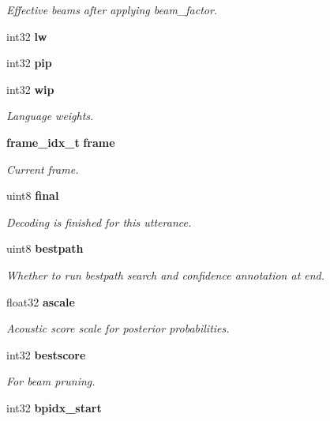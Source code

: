 \begin{DoxyCompactItemize}
\begin{DoxyCompactList}\small\item\em Effective beams after applying beam\+\_\+factor. \end{DoxyCompactList}\item 
int32 {\bfseries lw}\label{structfsg__search__s_a77c1f7f228ca66e48fb05e1ac2b2714a}

\item 
int32 {\bfseries pip}\label{structfsg__search__s_a2163d2c02c2dfe84a83c10fdb2d330a3}

\item 
int32 {\bf wip}\label{structfsg__search__s_ae9ddc3b50d0f164926392f8ab4b019a0}

\begin{DoxyCompactList}\small\item\em Language weights. \end{DoxyCompactList}\item 
{\bf frame\+\_\+idx\+\_\+t} {\bf frame}
\begin{DoxyCompactList}\small\item\em Current frame. \end{DoxyCompactList}\item 
uint8 {\bf final}
\begin{DoxyCompactList}\small\item\em Decoding is finished for this utterance. \end{DoxyCompactList}\item 
uint8 {\bf bestpath}
\begin{DoxyCompactList}\small\item\em Whether to run bestpath search and confidence annotation at end. \end{DoxyCompactList}\item 
float32 {\bf ascale}
\begin{DoxyCompactList}\small\item\em Acoustic score scale for posterior probabilities. \end{DoxyCompactList}\item 
int32 {\bf bestscore}\label{structfsg__search__s_a52880ad440412d76f7aae7e05977ba4b}

\begin{DoxyCompactList}\small\item\em For beam pruning. \end{DoxyCompactList}\item 
int32 {\bf bpidx\+\_\+start}\label{structfsg__search__s_a24d59609008ac132dca256d36a89f9c8}


\end{DoxyCompactItemize}
